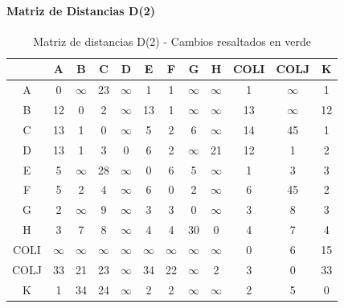 \documentclass[12pt]{article}
\begin{document}
\paragraph{Matriz de Distancias D(2)}
\begin{table}[h!]
\centering
\begin{tabular}{|c|c|c|c|c|c|c|c|c|c|c|c|}
\hline
 & A & B & C & D & E & F & G & H & COLI & COLJ & K \\\hline
A & 0 & $\infty$ & 23 & $\infty$ & 1 & 1 & $\infty$ & $\infty$ & 1 & $\infty$ & 1 \\\hline
B & 12 & 0 & 2 & $\infty$ & 13 & 1 & $\infty$ & $\infty$ & 13 & $\infty$ & 12 \\\hline
C & \cellcolor{lightgreen} 13 & 1 & 0 & $\infty$ & 5 & \cellcolor{lightgreen} 2 & 6 & $\infty$ & \cellcolor{lightgreen} 14 & 45 & 1 \\\hline
D & \cellcolor{lightgreen} 13 & 1 & \cellcolor{lightgreen} 3 & 0 & 6 & \cellcolor{lightgreen} 2 & $\infty$ & 21 & 12 & 1 & 2 \\\hline
E & 5 & $\infty$ & 28 & $\infty$ & 0 & 6 & 5 & $\infty$ & 1 & 3 & 3 \\\hline
F & 5 & 2 & \cellcolor{lightgreen} 4 & $\infty$ & 6 & 0 & 2 & $\infty$ & 6 & 45 & 2 \\\hline
G & 2 & $\infty$ & 9 & $\infty$ & 3 & 3 & 0 & $\infty$ & 3 & 8 & 3 \\\hline
H & 3 & 7 & 8 & $\infty$ & 4 & 4 & 30 & 0 & 4 & 7 & 4 \\\hline
COLI & $\infty$ & $\infty$ & $\infty$ & $\infty$ & $\infty$ & $\infty$ & $\infty$ & $\infty$ & 0 & 6 & 15 \\\hline
COLJ & \cellcolor{lightgreen} 33 & 21 & \cellcolor{lightgreen} 23 & $\infty$ & \cellcolor{lightgreen} 34 & \cellcolor{lightgreen} 22 & $\infty$ & 2 & 3 & 0 & \cellcolor{lightgreen} 33 \\\hline
K & 1 & 34 & 24 & $\infty$ & 2 & 2 & $\infty$ & $\infty$ & 2 & 5 & 0 \\\hline
\end{tabular}
\caption{Matriz de distancias D(2) - Cambios resaltados en verde}
\end{table}
\end{document}
